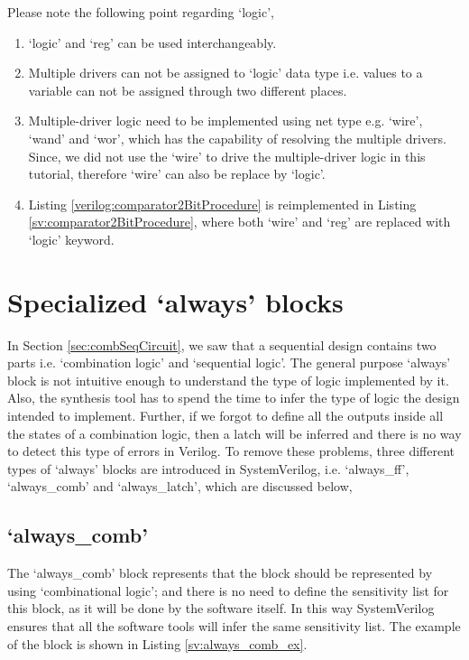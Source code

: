 \begin{noNumBox}
	Please note the following point regarding `logic', 
	\begin{enumerate}
		\item `logic' and `reg' can be used interchangeably. 
		\item Multiple drivers can not be assigned to `logic' data type i.e. values to a variable can not be assigned through two different places. 
		\item Multiple-driver logic need to be implemented using net type e.g. `wire', `wand' and `wor', which has the capability of resolving the multiple drivers. Since, we did not use the `wire' to drive the multiple-driver logic in this tutorial, therefore `wire' can also be replace by `logic'.
		\item Listing \ref{verilog:comparator2BitProcedure} is reimplemented in Listing \ref{sv:comparator2BitProcedure}, where both `wire' and `reg' are replaced with `logic' keyword. 
	\end{enumerate}
\end{noNumBox}



\section{Specialized `always' blocks}\label{sec:specialAlwaysBlk}
In Section \ref{sec:combSeqCircuit}, we saw that a sequential design contains two parts i.e. `combination logic' and `sequential logic'. The general purpose `always' block is not intuitive enough to understand the type of logic implemented by it. Also, the synthesis tool has to spend the time to infer the type of logic the design intended to implement. Further, if we forgot to define all the outputs inside all the states of a combination logic, then a latch will be inferred and there is no way to detect this type of errors in Verilog. To remove these problems, three different types of `always' blocks are introduced in SystemVerilog, i.e. `always\_ff', `always\_comb' and `always\_latch', which are discussed below, 

\subsection{`always\_comb'}
The `always\_comb' block represents that the block should be represented by using `combinational logic'; and there is no need to define the sensitivity list for this block, as it will be done by the software itself. In this way SystemVerilog ensures that all the software tools will infer the same sensitivity list. The example of the block is shown in Listing \ref{sv:always_comb_ex}. 


